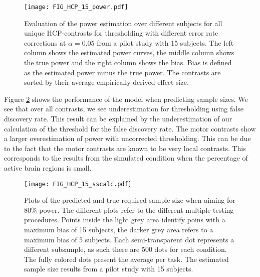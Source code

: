 \begin{center}
\begin{figure}[h]
\texttt{[image: FIG\_HCP\_15\_power.pdf]}
\caption{Evaluation of the power estimation over different subjects for all unique HCP-contrasts for thresholding with different error rate corrections at $\alpha=0.05$ from a pilot study with 15 subjects. The left column shows the estimated power curves, the middle column shows the true power and the right column shows the bias.  Bias is defined as the estimated power minus the true power.  The contrasts are sorted by their average empirically derived effect size. \label{HCP_bias}}
\end{figure}
\end{center}

Figure \ref{HCP_ss} shows the performance of the model when predicting sample sizes.  We see that over all contrasts, we see underestimation for thresholding using false discovery rate.  This result can be explained by the underestimation of our calculation of the threshold for the false discovery rate. %
The motor contrasts show a larger overestimation of power with uncorrected thresholding.  This can be due to the fact that the motor contrasts are known to be very local contrasts. This corresponds to the results from the simulated condition when the percentage of active brain regions is small.

\begin{center}
\begin{figure}[h]
\texttt{[image: FIG\_HCP\_15\_sscalc.pdf]}
\caption{Plots of the predicted and true required sample size when aiming for 80\% power. The different plots refer to the different multiple testing procedures.  Points inside the light grey area identify poins with a maximum bias of 15 subjects, the darker grey area refers to a maximum bias of 5 subjects.  Each semi-transparent dot represents a different subsample, as such there are 500 dots for each condition.  The fully colored dots present the average per task.  The estimated sample size results from a pilot study with 15 subjects. \label{HCP_ss}}
\end{figure}
\end{center}
